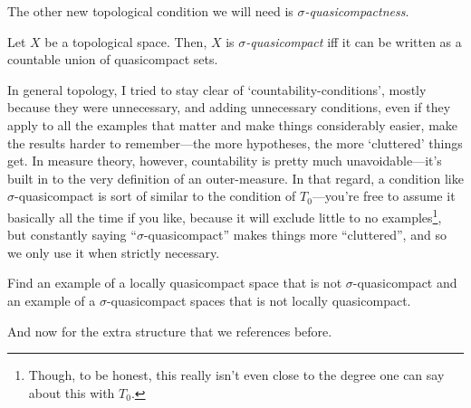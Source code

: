 The other new topological condition we will need is \emph{$\sigma$-quasicompactness}.
\begin{dfn}
Let $X$ be a topological space.  Then, $X$ is \emph{$\sigma$-quasicompact} iff it can be written as a countable union of quasicompact sets.
\begin{rmk}
In general topology, I tried to stay clear of `countability-conditions', mostly because they were unnecessary, and adding unnecessary conditions, even if they apply to all the examples that matter and make things considerably easier, make the results harder to remember---the more hypotheses, the more `cluttered' things get.  In measure theory, however, countability is pretty much unavoidable---it's built in to the very definition of an outer-measure.  In that regard, a condition like $\sigma$-quasicompact is sort of similar to the condition of $T_0$---you're free to assume it basically all the time if you like, because it will exclude little to no examples\footnote{Though, to be honest, this really isn't even close to the degree one can say about this with $T_0$.}, but constantly saying ``$\sigma$-quasicompact'' makes things more ``cluttered'', and so we only use it when strictly necessary.
\end{rmk}
\end{dfn}
\begin{exr}
Find an example of a locally quasicompact space that is not $\sigma$-quasicompact and an example of a $\sigma$-quasicompact spaces that is not locally quasicompact.
\end{exr}
And now for the extra structure that we references before.
